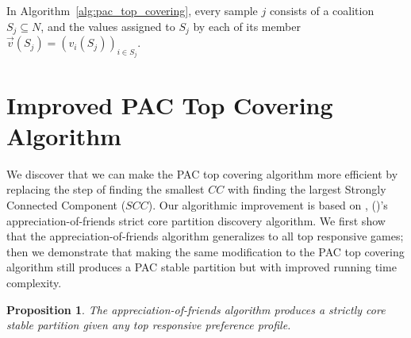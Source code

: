 \documentclass[letterpaper]{article} %
\newcommand{\citename}[1]{\citeauthor{#1}, (\citeyear{#1})}
\newcommand{\CC}{\mathit{CC}}
\newcommand{\SCC}{\mathit{SCC}}
\newtheorem{proposition}[theorem]{Proposition}
\theoremstyle{definition}
\begin{document}
In Algorithm~\ref{alg:pac_top_covering}, every sample $j$ consists of a coalition $S_j \subseteq N$, and the values assigned to $S_j$ by each of its member $\vec{v}(S_j) = (v_i(S_j))_{i \in S_j}$.

\section{Improved PAC Top Covering Algorithm}\label{sec:improved_algo}
We discover that we can make the PAC top covering algorithm more efficient by replacing the step of finding the smallest $\CC$ with finding the largest Strongly Connected Component ($\SCC$). Our algorithmic improvement is based on \citename{Dimitrov2006}'s appreciation-of-friends strict core partition discovery algorithm. We first show that the appreciation-of-friends algorithm generalizes to all top responsive games; then we demonstrate that making the same modification to the PAC top covering algorithm still produces a PAC stable partition but with improved running time complexity.

\begin{proposition}
\label{prop:scc_generalizes}
  The appreciation-of-friends algorithm produces a strictly core stable partition given any top responsive preference profile.
\end{proposition}
\end{document}
